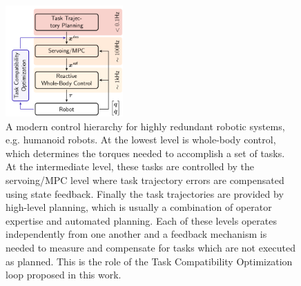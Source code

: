 \begin{figure}
\centering
\includegraphics[width=0.4\textwidth]{images/control_pyramid.png}
\caption{A modern control hierarchy for highly redundant robotic systems, e.g. humanoid robots. At the lowest level is whole-body control, which determines the torques needed to accomplish a set of tasks. At the intermediate level, these tasks are controlled by the servoing/MPC level where task trajectory errors are compensated using state feedback. Finally the task trajectories are provided by high-level planning, which is usually a combination of operator expertise and automated planning. Each of these levels operates independently from one another and a feedback mechanism is needed to measure and compensate for tasks which are not executed as planned. This is the role of the Task Compatibility Optimization loop proposed in this work.}
\label{fig:control_diagram}
\end{figure}

